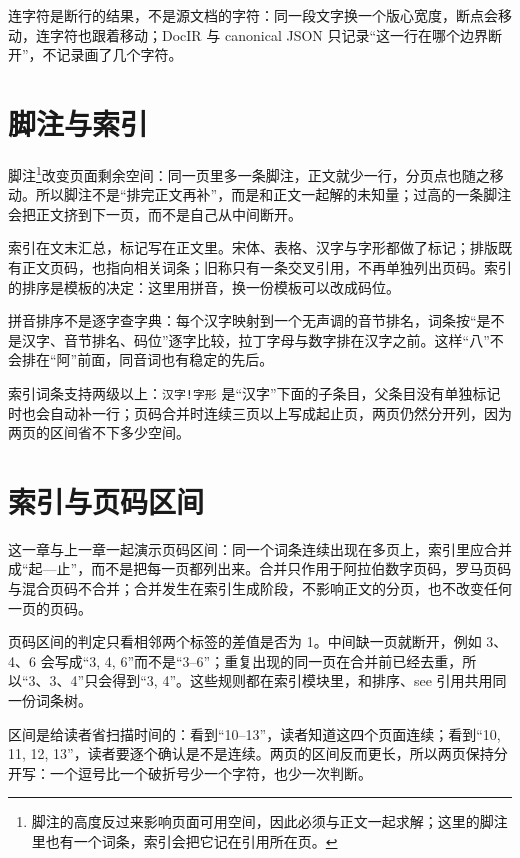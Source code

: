 \documentclass{article}
\begin{document}
连字符是断行的结果，不是源文档的字符：同一段文字换一个版心宽度，断点会移动，连字符也跟着移动；DocIR 与 canonical JSON 只记录“这一行在哪个边界断开”，不记录画了几个字符。

\section{脚注与索引}

脚注\footnote{脚注的高度反过来影响页面可用空间，因此必须与正文一起求解；这里的脚注里也有一个词条，索引会把它记在引用所在页。}改变页面剩余空间：同一页里多一条脚注，正文就少一行，分页点也随之移动。所以脚注不是“排完正文再补”，而是和正文一起解的未知量；过高的一条脚注会把正文挤到下一页，而不是自己从中间断开。

索引在文末汇总，标记写在正文里。宋体、表格、汉字与字形都做了标记；排版既有正文页码，也指向相关词条；旧称只有一条交叉引用，不再单独列出页码。索引的排序是模板的决定：这里用拼音，换一份模板可以改成码位。

拼音排序不是逐字查字典：每个汉字映射到一个无声调的音节排名，词条按“是不是汉字、音节排名、码位”逐字比较，拉丁字母与数字排在汉字之前。这样“八”不会排在“阿”前面，同音词也有稳定的先后。

索引词条支持两级以上：\texttt{汉字!字形} 是“汉字”下面的子条目，父条目没有单独标记时也会自动补一行；页码合并时连续三页以上写成起止页，两页仍然分开列，因为两页的区间省不下多少空间。

\section{索引与页码区间}

这一章与上一章一起演示页码区间：同一个词条连续出现在多页上，索引里应合并成“起—止”，而不是把每一页都列出来。合并只作用于阿拉伯数字页码，罗马页码与混合页码不合并；合并发生在索引生成阶段，不影响正文的分页，也不改变任何一页的页码。

页码区间的判定只看相邻两个标签的差值是否为 1。中间缺一页就断开，例如 3、4、6 会写成“3, 4, 6”而不是“3–6”；重复出现的同一页在合并前已经去重，所以“3、3、4”只会得到“3, 4”。这些规则都在索引模块里，和排序、see 引用共用同一份词条树。

区间是给读者省扫描时间的：看到“10–13”，读者知道这四个页面连续；看到“10, 11, 12, 13”，读者要逐个确认是不是连续。两页的区间反而更长，所以两页保持分开写：一个逗号比一个破折号少一个字符，也少一次判断。
\end{document}
